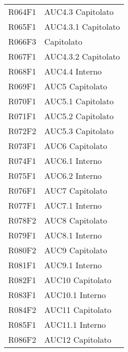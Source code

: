 \documentclass[../analisi-dei-requisiti.tex]{subfiles}
\begin{document}
\begin{longtable}[H]{ p{3cm} | p{4cm} }
  R064F1                               & AUC4.3 Capitolato             \\
  R065F1                               & AUC4.3.1 Capitolato           \\
  R066F3                               & Capitolato                    \\
  R067F1                               & AUC4.3.2 Capitolato           \\
  R068F1                               & AUC4.4 Interno                \\
  R069F1                               & AUC5 Capitolato               \\
  R070F1                               & AUC5.1 Capitolato             \\
  R071F1                               & AUC5.2 Capitolato             \\
  R072F2                               & AUC5.3 Capitolato             \\
  R073F1                               & AUC6 Capitolato               \\
  R074F1                               & AUC6.1 Interno                \\
  R075F1                               & AUC6.2 Interno                \\
  R076F1                               & AUC7 Capitolato               \\
  R077F1                               & AUC7.1 Interno                \\
  R078F2                               & AUC8 Capitolato               \\
  R079F1                               & AUC8.1 Interno                \\
  R080F2                               & AUC9 Capitolato               \\
  R081F1                               & AUC9.1 Interno                \\
  R082F1                               & AUC10 Capitolato              \\
  R083F1                               & AUC10.1 Interno               \\
  R084F2                               & AUC11 Capitolato              \\
  R085F1                               & AUC11.1 Interno               \\
  R086F2                               & AUC12 Capitolato              \\

\end{longtable}
\end{document}
